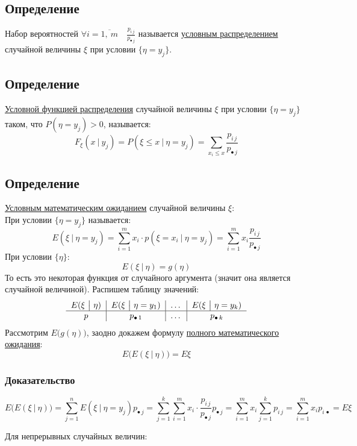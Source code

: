 \documentclass[12pt, a4paper]{article}
\begin{document}
    \subsection*{Определение}
    Набор вероятностей $\forall i = \overline{1,\ m}\quad \frac{p_{i\, j}}{p_{\bullet\, j}}$ называется \underline{условным распределением} случайной величины $\xi$ при условии $\{\eta = y_j\}$.
    \subsection*{Определение}
    \underline{Условной функцией распределения} случайной величины $\xi$ при условии $\{\eta = y_j\}$ таком, что $P(\eta = y_j) > 0$, называется:
    \[F_{\xi}(x\ \big|\ y_j) = P(\xi \leq x\ \big|\ \eta = y_j) = \sum_{x_i \leq x} \frac{p_{i\, j}}{p_{\bullet\, j}}\]
    \subsection*{Определение}
    \underline{Условным математическим ожиданием} случайной величины $\xi$:\\
    При условии $\{\eta = y_j\}$ называется:
    \[E(\xi\ \big|\ \eta = y_j) = \sum_{i = 1}^{m} x_i\cdot p(\xi = x_i\ \big|\ \eta = y_j) = \sum_{i = 1}^{m} x_i \frac{p_{i\, j}}{p_{\bullet\, j}}\]
    При условии $\{\eta\}$:
    \[E(\xi\ \big|\ \eta) = g(\eta)\]
    То есть это некоторая функция от случайного аргумента (значит она является случайной величиной). Распишем таблицу значений:
    \[\begin{tabular}{c|c|c|c}
        $E(\xi\ \big|\ \eta)$ & $E(\xi\ \big|\ \eta = y_1)$ & $\dots$ & $E(\xi\ \big|\ \eta = y_k)$\\
        \hline
        $p$                   & $p_{\bullet\, 1}$           & $\dots$ & $p_{\bullet\, k}$
    \end{tabular}\]
    Рассмотрим $E\big(g(\eta)\big)$, заодно докажем формулу \underline{полного математического ожидания}:
    \[E\big(E(\xi\ \big|\ \eta)\big) = E\xi\]
    \subsubsection*{Доказательство}
    \[E\big(E(\xi\ \big|\ \eta)\big) = \sum_{j = 1}^{n} E(\xi\ \big|\ \eta = y_j) p_{\bullet\, j} = \sum_{j = 1}^{k}\sum_{i = 1}^{m} x_i\cdot \frac{p_{i\, j}}{p_{\bullet\, j}} p_{\bullet\, j} = \sum_{i = 1}^{m} x_i \sum_{j = 1}^{k} p_{i\, j} = \sum_{i = 1}^{m} x_i p_{i\, \bullet} = E\xi\]
    \begin{center}
        Для непрерывных случайных величин:
    \end{center}
\end{document}
